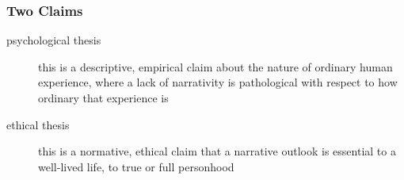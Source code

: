 \documentclass[xcolor=dvipsnames]{beamer}
\begin{document}

\begin{frame}
  \frametitle{Two Claims}
  \begin{description}
  \item[psychological thesis] this is a descriptive, empirical claim
    about the nature of ordinary human experience, where a lack of
    narrativity is pathological with respect to how ordinary that
    experience is
  \item[ethical thesis] this is a normative, ethical claim that a
    narrative outlook is essential to a well-lived life, to true or
    full personhood
  \end{description}
\end{frame}
\end{document}
